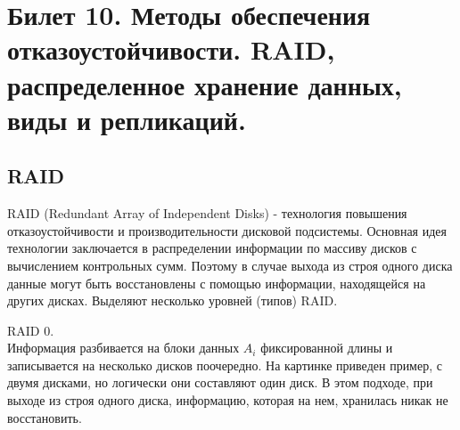 \newpage
\section {Билет 10. Методы обеспечения отказоустойчивости. RAID, распределенное хранение данных, виды и репликаций.}
\subsection {RAID}
RAID (Redundant Array of Independent Disks) - технология повышения отказоустойчивости и производительности дисковой подсистемы. Основная идея технологии заключается в распределении информации по массиву дисков с вычислением контрольных сумм. Поэтому в случае выхода из строя одного диска данные могут быть восстановлены с помощью информации, находящейся на других дисках. 
Выделяют несколько уровней (типов) RAID.

RAID 0. \\
Информация разбивается на блоки данных $A_{i}$ фиксированной длины и записывается на несколько дисков поочередно. На картинке приведен пример, с двумя дисками, но логически они составляют один диск. В этом подходе, при выходе из строя одного диска, информацию, которая на нем, хранилась никак не восстановить.

